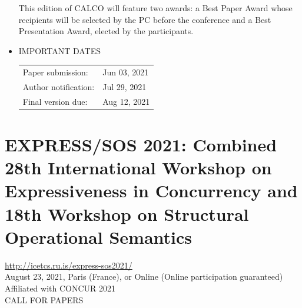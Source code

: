 \documentclass[prodmode,acmtecs]{acmsmall} %
\begin{document}
\begin{itemize}
  This edition of CALCO will feature two awards: a Best Paper Award whose  recipients will be selected by the PC before the conference and a Best Presentation Award, elected by the participants.  
 
\item  IMPORTANT DATES 
 
\begin{tabulary}{\linewidth}{LL}Paper submission:  & Jun 03, 2021 \\
Author notification:  & Jul 29, 2021 \\
Final version due:  & Aug 12, 2021 \\
\end{tabulary}
 
\end{itemize}\section{EXPRESS/SOS 2021: Combined 28th International Workshop on Expressiveness in Concurrency and 18th Workshop on Structural Operational Semantics}\label{EXPRESSSOS2021}  \href{http://icetcs.ru.is/express-sos2021/}{http://icetcs.ru.is/express-sos2021/}\\ 
  August 23, 2021, Paris (France), or Online (Online participation guaranteed)\\ 
  Affiliated with CONCUR 2021\\ 
CALL FOR PAPERS 
\end{document}
